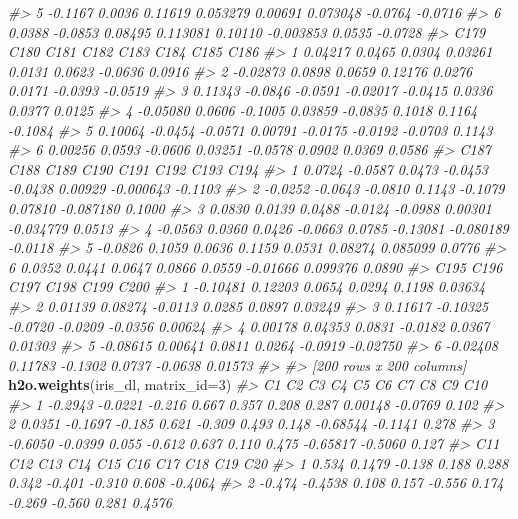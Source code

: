 \documentclass[]{book}
\newenvironment{Shaded}{\begin{snugshade}}{\end{snugshade}}
\newcommand{\CommentTok}[1]{\textcolor[rgb]{0.56,0.35,0.01}{\textit{#1}}}
\newcommand{\DataTypeTok}[1]{\textcolor[rgb]{0.13,0.29,0.53}{#1}}
\newcommand{\DecValTok}[1]{\textcolor[rgb]{0.00,0.00,0.81}{#1}}
\newcommand{\KeywordTok}[1]{\textcolor[rgb]{0.13,0.29,0.53}{\textbf{#1}}}
\newcommand{\NormalTok}[1]{#1}
\begin{document}
\begin{Shaded}
\begin{Highlighting}[]
{{{{{\CommentTok{#> 5 -0.1167  0.0036  0.11619  0.053279  0.00691  0.073048 -0.0764 -0.0716}
\CommentTok{#> 6  0.0388 -0.0853  0.08495  0.113081  0.10110 -0.003853  0.0535 -0.0728}
\CommentTok{#>       C179    C180    C181     C182    C183    C184    C185    C186}
\CommentTok{#> 1  0.04217  0.0465  0.0304  0.03261  0.0131  0.0623 -0.0636  0.0916}
\CommentTok{#> 2 -0.02873  0.0898  0.0659  0.12176  0.0276  0.0171 -0.0393 -0.0519}
\CommentTok{#> 3  0.11343 -0.0846 -0.0591 -0.02017 -0.0415  0.0336  0.0377  0.0125}
\CommentTok{#> 4 -0.05080  0.0606 -0.1005  0.03859 -0.0835  0.1018  0.1164 -0.1084}
\CommentTok{#> 5  0.10064 -0.0454 -0.0571  0.00791 -0.0175 -0.0192 -0.0703  0.1143}
\CommentTok{#> 6  0.00256  0.0593 -0.0606  0.03251 -0.0578  0.0902  0.0369  0.0586}
\CommentTok{#>      C187    C188    C189    C190    C191     C192      C193    C194}
\CommentTok{#> 1  0.0724 -0.0587  0.0473 -0.0453 -0.0438  0.00929 -0.000643 -0.1103}
\CommentTok{#> 2 -0.0252 -0.0643 -0.0810  0.1143 -0.1079  0.07810 -0.087180  0.1000}
\CommentTok{#> 3  0.0830  0.0139  0.0488 -0.0124 -0.0988  0.00301 -0.034779  0.0513}
\CommentTok{#> 4 -0.0563  0.0360  0.0426 -0.0663  0.0785 -0.13081 -0.080189 -0.0118}
\CommentTok{#> 5 -0.0826  0.1059  0.0636  0.1159  0.0531  0.08274  0.085099  0.0776}
\CommentTok{#> 6  0.0352  0.0441  0.0647  0.0866  0.0559 -0.01666  0.099376  0.0890}
\CommentTok{#>       C195     C196    C197    C198    C199     C200}
\CommentTok{#> 1 -0.10481  0.12203  0.0654  0.0294  0.1198  0.03634}
\CommentTok{#> 2  0.01139  0.08274 -0.0113  0.0285  0.0897  0.03249}
\CommentTok{#> 3  0.11617 -0.10325 -0.0720 -0.0209 -0.0356  0.00624}
\CommentTok{#> 4  0.00178  0.04353  0.0831 -0.0182  0.0367  0.01303}
\CommentTok{#> 5 -0.08615  0.00641  0.0811  0.0264 -0.0919 -0.02750}
\CommentTok{#> 6 -0.02408  0.11783 -0.1302  0.0737 -0.0638  0.01573}
\CommentTok{#> }
\CommentTok{#> [200 rows x 200 columns]}
\KeywordTok{h2o.weights}\NormalTok{(iris_dl, }\DataTypeTok{matrix_id=}\DecValTok{3}\NormalTok{)}
\CommentTok{#>        C1      C2     C3     C4     C5    C6    C7       C8      C9   C10}
\CommentTok{#> 1 -0.2943 -0.0221 -0.216  0.667  0.357 0.208 0.287  0.00148 -0.0769 0.102}
\CommentTok{#> 2  0.0351 -0.1697 -0.185  0.621 -0.309 0.493 0.148 -0.68544 -0.1141 0.278}
\CommentTok{#> 3 -0.6050 -0.0399  0.055 -0.612  0.637 0.110 0.475 -0.65817 -0.5060 0.127}
\CommentTok{#>      C11     C12    C13   C14    C15    C16    C17    C18   C19     C20}
\CommentTok{#> 1  0.534  0.1479 -0.138 0.188  0.288  0.342 -0.401 -0.310 0.608 -0.4064}
\CommentTok{#> 2 -0.474 -0.4538  0.108 0.157 -0.556  0.174 -0.269 -0.560 0.281  0.4576}
}}}}}
\end{Highlighting}
\end{Shaded}
\end{document}
